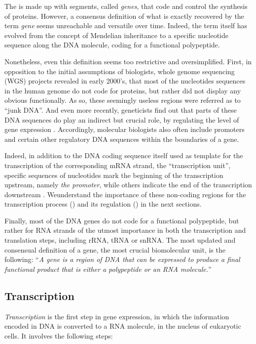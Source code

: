 The  is made up with segments, called \emph{genes}, that code and control the synthesis of proteins. However, a consensus definition of what is exactly recovered by the term \emph{gene} seems unreachable and versatile over time. Indeed, the term itself has evolved from the concept of Mendelian inheritance to a specific nucleotide sequence along the DNA molecule, coding for a functional polypeptide. 

Nonetheless, even this definition seems too restrictive and oversimplified. First, in opposition to the initial assumptions of biologists,  whole genome sequencing (WGS) projects revealed in early 2000's, that most of the nucleotides sequences in the human genome do not code for proteins, but rather did not display any obvious functionally. As so, these seemingly useless regions were referred as to \enquote{junk DNA}. And even more recently, geneticists find out that parts of these DNA sequences do play an indirect but crucial role, by regulating the level of gene expression . Accordingly, molecular biologists also often include promoters and certain other regulatory DNA sequences within the boundaries of a gene.

Indeed, in addition to the DNA coding sequence itself used as template for the transcription of the corresponding mRNA strand, the \enquote{transcription unit}, specific sequences of nucleotides mark the beginning of the transcription upstream, namely \emph{the promoter}, while others indicate the end of the transcription downstream . Weunderstand the importance of these non-coding regions for the transcription process () and its regulation () in the next sections.

Finally, most of the DNA genes do not code for a functional polypeptide, but rather for RNA strands of the utmost importance in both the transcription and translation steps, including rRNA, tRNA or snRNA. The most updated and consensual definition of a gene, the most crucial biomolecular unit, is the following: \enquote{\emph{A gene is a region of DNA that can be expressed to produce a final functional product that is either a polypeptide or an RNA molecule.}}


\subsection{Transcription}
\label{subsec:transcript}

\emph{Transcription} is the first step in gene expression, in which the information encoded in DNA is converted to a RNA molecule, in the nucleus of eukaryotic cells.  It involves the following steps:

